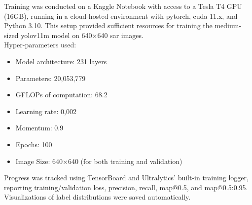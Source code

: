 \documentclass{article}
\begin{document}
	Training was conducted on a Kaggle Notebook with access to a Tesla T4 GPU (16GB), running in a cloud-hosted environment with \acrshort{pytorch}, \acrshort{cuda} 11.x, and Python 3.10. This setup provided sufficient resources for training the medium-sized \acrshort{yolov11m} model on 640×640 \acrshort{sar} images.\\
	
	Hyper-parameters used:
	\begin{itemize}
		\item Model architecture: 231 layers
		\item Parameters: 20,053,779
		\item GFLOPs of computation: 68.2
		\item Learning rate: 0,002
		\item Momentum: 0.9
		\item Epochs: 100
		\item Image Size: 640×640 (for both training and validation)
	\end{itemize}
	
	Progress was tracked using TensorBoard and Ultralytics’ built-in training logger, reporting training/validation loss, precision, recall, \acrshort{map}@0.5, and \acrshort{map}@0.5:0.95. Visualizations of label distributions were saved automatically.\\
	
\end{document}
